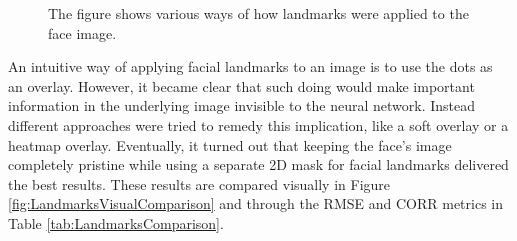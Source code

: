 \begin{figure}[htbp]
\begin{center}
  \caption[Ablation study: Landmark visualizations]{The figure shows various ways of how landmarks were applied to the face image.}
  \label{fig:LandmarksImages}
  \end{center}
\end{figure}

\noindent An intuitive way of applying facial landmarks to an image is to use the dots as an overlay. However, it became clear that such doing would make important information in the underlying image invisible to the neural network. Instead different approaches were tried to remedy this implication, like a soft overlay or a heatmap overlay. Eventually, it turned out that keeping the face's image completely pristine while using a separate 2D mask for facial landmarks delivered the best results. These results are compared visually in Figure \ref{fig:LandmarksVisualComparison} and through the RMSE and CORR metrics in Table \ref{tab:LandmarksComparison}.\newline

